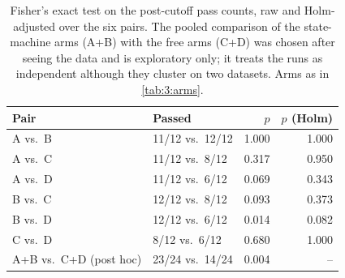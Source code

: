 \begin{table}[htbp]
  \centering
  \small
  \caption[Fisher's exact test on the post-cutoff pass counts]{Fisher's exact test on the post-cutoff pass counts, raw and Holm-adjusted over the six pairs. The pooled comparison of the state-machine arms (A+B) with the free arms (C+D) was chosen after seeing the data and is exploratory only; it treats the runs as independent although they cluster on two datasets. Arms as in \autoref{tab:3:arms}.}
  \label{tab:6:postcutoff-tests}
  \begin{tabular}{llrr}
    \toprule
    Pair & Passed & $p$ & $p$ (Holm) \\
    \midrule
    A vs.\ B & 11/12 vs.\ 12/12 & 1.000 & 1.000 \\
    A vs.\ C & 11/12 vs.\ 8/12 & 0.317 & 0.950 \\
    A vs.\ D & 11/12 vs.\ 6/12 & 0.069 & 0.343 \\
    B vs.\ C & 12/12 vs.\ 8/12 & 0.093 & 0.373 \\
    B vs.\ D & 12/12 vs.\ 6/12 & 0.014 & 0.082 \\
    C vs.\ D & 8/12 vs.\ 6/12 & 0.680 & 1.000 \\
    \midrule
    A+B vs.\ C+D (post hoc) & 23/24 vs.\ 14/24 & 0.004 & -- \\
    \bottomrule
  \end{tabular}
\end{table}
